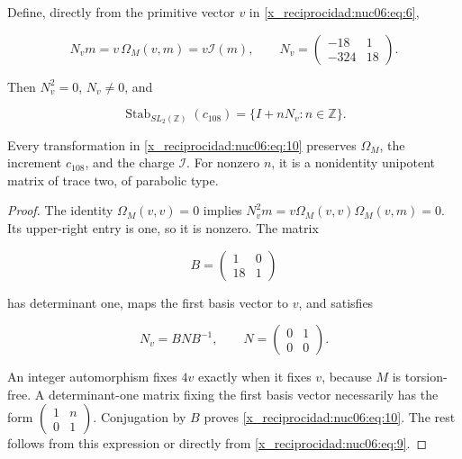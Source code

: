 \begin{theorem}

Define, directly from the primitive vector \(v\) in \eqref{x_reciprocidad:nuc06:eq:6},

\begin{equation}
N_v m=v\,\Omega_M(v,m)=v\mathcal I(m),\qquad
N_v=\begin{pmatrix}-18&1\\-324&18\end{pmatrix}.
\label{x_reciprocidad:nuc06:eq:9}
\end{equation}

Then \(N_v^2=0\), \(N_v\ne0\), and

\begin{equation}
\boxed{\quad
\operatorname{Stab}_{SL_2(\mathbb Z)}(c_{108})
=\{I+nN_v:n\in\mathbb Z\}.
\quad}
\label{x_reciprocidad:nuc06:eq:10}
\end{equation}

Every transformation in \eqref{x_reciprocidad:nuc06:eq:10} preserves \(\Omega_M\), the increment \(c_{108}\), and the charge \(\mathcal I\). For nonzero \(n\), it is a nonidentity unipotent matrix of trace two, of parabolic type.
\end{theorem}

\begin{proof}
The identity \(\Omega_M(v,v)=0\) implies \(N_v^2m=v\Omega_M(v,v)\Omega_M(v,m)=0\). Its upper-right entry is one, so it is nonzero. The matrix

\[
B=\begin{pmatrix}1&0\\18&1\end{pmatrix}
\]

has determinant one, maps the first basis vector to \(v\), and satisfies

\begin{equation}
N_v=BNB^{-1},\qquad N=\begin{pmatrix}0&1\\0&0\end{pmatrix}.
\label{x_reciprocidad:nuc06:eq:11}
\end{equation}

An integer automorphism fixes \(4v\) exactly when it fixes \(v\), because \(M\) is torsion-free. A determinant-one matrix fixing the first basis vector necessarily has the form \(\begin{pmatrix}1&n\\0&1\end{pmatrix}\). Conjugation by \(B\) proves \eqref{x_reciprocidad:nuc06:eq:10}. The rest follows from this expression or directly from \eqref{x_reciprocidad:nuc06:eq:9}.
\end{proof}

